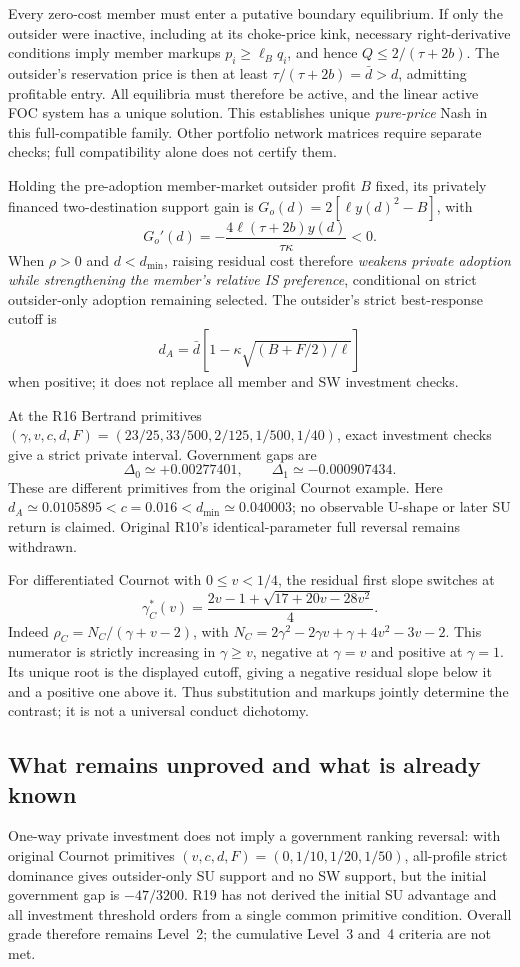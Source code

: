 Every zero-cost member must enter a putative boundary equilibrium. If
only the outsider were inactive, including at its choke-price kink,
necessary right-derivative conditions imply member markups
\(p_i\ge\ell_Bq_i\), and hence
\(Q\le2/(\tau+2b)\). The outsider's reservation price is then at
least \(\tau/(\tau+2b)=\bar d>d\), admitting profitable entry.
All equilibria must therefore be active, and the linear active FOC system
has a unique solution. This establishes unique \emph{pure-price} Nash
in this full-compatible family. Other portfolio network matrices require
separate checks; full compatibility alone does not certify them.

Holding the pre-adoption member-market outsider profit \(B\) fixed,
its privately financed two-destination support gain is
\(G_o(d)=2[\ell y(d)^2-B]\), with
\[
G_o'(d)=-\frac{4\ell(\tau+2b)y(d)}{\tau\kappa}<0.
\]
When \(\rho>0\) and \(d<d_{\min}\), raising residual cost
therefore \emph{weakens private adoption while strengthening the member's
relative IS preference}, conditional on strict outsider-only adoption
remaining selected. The outsider's strict best-response cutoff is
\[
d_A=\bar d\left[1-\kappa\sqrt{(B+F/2)/\ell}\right]
\]
when positive; it does not replace all member and SW investment checks.

At the R16 Bertrand primitives
\((\gamma,v,c,d,F)=(23/25,33/500,2/125,1/500,1/40)\),
exact investment checks give a strict private interval. Government gaps are
\[
\Delta_0\simeq+0.00277401,\qquad \Delta_1\simeq-0.000907434.
\] These are different primitives from the original
Cournot example. Here \(d_A\simeq0.0105895<c=0.016<d_{\min}
\simeq0.040003\); no observable U-shape or later SU return is claimed.
Original R10's identical-parameter full reversal remains withdrawn.

For differentiated Cournot with \(0\le v<1/4\), the residual first
slope switches at
\[
\gamma_C^*(v)=\frac{2v-1+\sqrt{17+20v-28v^2}}4.
\]
Indeed \(\rho_C=N_C/(\gamma+v-2)\), with
\(N_C=2\gamma^2-2\gamma v+\gamma+4v^2-3v-2\).
This numerator is strictly increasing in \(\gamma\ge v\), negative
at \(\gamma=v\) and positive at \(\gamma=1\). Its unique root is
the displayed cutoff, giving a negative residual slope below it and a
positive one above it. Thus substitution and markups jointly determine
the contrast; it is not a universal conduct dichotomy.

\subsection{What remains unproved and what is already known}
One-way private investment does not imply a government ranking reversal:
with original Cournot primitives \((v,c,d,F)=(0,1/10,1/20,1/50)\),
all-profile strict dominance gives outsider-only SU support and no SW
support, but the initial government gap is \(-47/3200\).
R19 has not derived the initial SU advantage and all investment threshold
orders from a single common primitive condition. Overall grade therefore
remains Level~2; the cumulative Level~3 and~4 criteria are not met.

